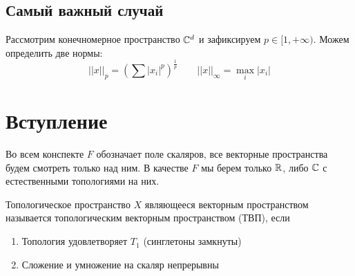 \documentclass[12pt, a4paper, oneside]{book}
\begin{document}
\SupplKernOn
%

\frontmatter

\tableofcontents
\pagebreak


\mainmatter

\subsection{Самый важный случай}
Рассмотрим конечномерное пространство $\mathbb{C}^d$ и зафиксируем $p \in [1,+\infty)$. Можем определить две нормы:
$$||x||_p = \left(\sum |x_i|^p\right)^{\frac{1}{p}}\qquad ||x||_\infty = \max_{i} |x_i|$$
\section{Вступление}
Во всем конспекте $F$ обозначает поле скаляров, все векторные пространства будем смотреть только над ним.
В качестве $F$ мы берем только $\mathbb{R}$, либо $\mathbb{C}$ с естественными топологиями на них.

\begin{definition}
    Топологическое пространство $X$ являющееся векторным пространством называется
    топологическим векторным пространством (ТВП), если
    \begin{enumerate}
        \item Топология удовлетворяет $T_1$ (синглетоны замкнуты)
        \item Сложение и умножение на скаляр непрерывны
    \end{enumerate}
\end{definition}
\end{document}

